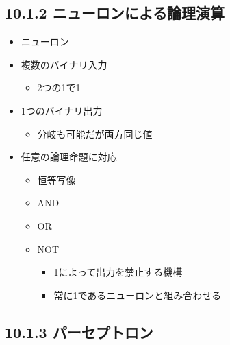 \hypertarget{ux30cbux30e5ux30fcux30edux30f3ux306bux3088ux308bux8ad6ux7406ux6f14ux7b97}{%
\subsection{10.1.2
ニューロンによる論理演算}\label{ux30cbux30e5ux30fcux30edux30f3ux306bux3088ux308bux8ad6ux7406ux6f14ux7b97}}

\begin{itemize}
\tightlist
\item
  ニューロン
\item
  複数のバイナリ入力

  \begin{itemize}
  \tightlist
  \item
    2つの1で1
  \end{itemize}
\item
  1つのバイナリ出力

  \begin{itemize}
  \tightlist
  \item
    分岐も可能だが両方同じ値
  \end{itemize}
\item
  任意の論理命題に対応

  \begin{itemize}
  \tightlist
  \item
    恒等写像
  \item
    AND
  \item
    OR
  \item
    NOT

    \begin{itemize}
    \tightlist
    \item
      1によって出力を禁止する機構
    \item
      常に1であるニューロンと組み合わせる
    \end{itemize}
  \end{itemize}
\end{itemize}

\hypertarget{ux30d1ux30fcux30bbux30d7ux30c8ux30edux30f3}{%
\subsection{10.1.3
パーセプトロン}\label{ux30d1ux30fcux30bbux30d7ux30c8ux30edux30f3}}

